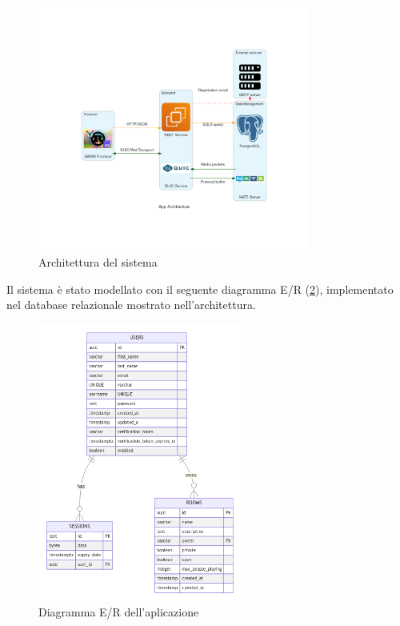 \documentclass{article}
\begin{document}
\begin{figure}[h]
  \begin{center}
    \includegraphics[width=0.8\textwidth]{figures/architecture.png}
  \end{center}
  \caption{Architettura del sistema}\label{fig:architecture}
\end{figure}

Il sistema è stato modellato con il seguente diagramma E/R (\cref{fig:er}), implementato nel database 
relazionale mostrato nell'architettura. 

\begin{figure}[h]
  \begin{center}
    \includegraphics[width=0.6\textwidth]{figures/er.png}
  \end{center}
  \caption{Diagramma E/R dell'aplicazione}\label{fig:er}
\end{figure}
\end{document}
